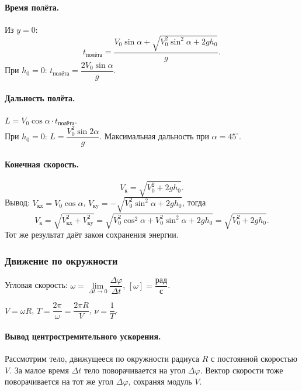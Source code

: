 \documentclass[12pt]{article}
\begin{document}
\paragraph{Время полёта.} Из $y = 0$:
\[
	t_{\text{полёта}} = \frac{V_0 \sin\alpha + \sqrt{V_0^2 \sin^2\alpha + 2g h_0}}{g}.
\]
При $h_0 = 0$: $t_{\text{полёта}} = \dfrac{2 V_0 \sin\alpha}{g}$.

\paragraph{Дальность полёта.} $L = V_0 \cos\alpha \cdot t_{\text{полёта}}$.\\
При $h_0 = 0$: $L = \dfrac{V_0^2 \sin 2\alpha}{g}$. Максимальная дальность при $\alpha = 45^\circ$.

\paragraph{Конечная скорость.}
\[
	V_{\text{к}} = \sqrt{V_0^2 + 2g h_0}.
\]
Вывод: $V_{\text{кx}} = V_0\cos\alpha$, $V_{\text{кy}} = -\sqrt{V_0^2\sin^2\alpha + 2gh_0}$, тогда
\[
	V_{\text{к}} = \sqrt{V_{\text{кx}}^2 + V_{\text{кy}}^2} = \sqrt{V_0^2\cos^2\alpha + V_0^2\sin^2\alpha + 2gh_0} = \sqrt{V_0^2 + 2gh_0}.
\]
Тот же результат даёт закон сохранения энергии.

\subsubsection{Движение по окружности}

\begin{definition}
	Угловая скорость: $\omega = \lim\limits_{\Delta t \to 0} \dfrac{\Delta\varphi}{\Delta t}$, $[\omega] = \dfrac{\text{рад}}{\text{с}}$.
\end{definition}

\begin{statement}
	$V = \omega R$, \quad $T = \dfrac{2\pi}{\omega} = \dfrac{2\pi R}{V}$, \quad $\nu = \dfrac{1}{T}$.
\end{statement}

\paragraph{Вывод центростремительного ускорения.}

Рассмотрим тело, движущееся по окружности радиуса $R$ с постоянной скоростью $V$. За малое время $\Delta t$ тело поворачивается на угол $\Delta\varphi$. Вектор скорости тоже поворачивается на тот же угол $\Delta\varphi$, сохраняя модуль $V$.
\end{document}
